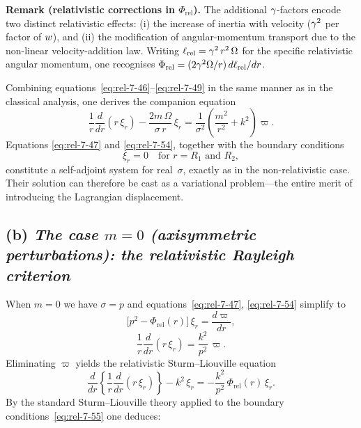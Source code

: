 \medskip
\noindent\textbf{Remark (relativistic corrections in $\Phi_{\mathrm{rel}}$).}
The additional $\gamma$-factors encode two distinct relativistic effects:
(i) the increase of inertia with velocity ($\gamma^{2}$ per factor of
$w$), and (ii) the modification of angular-momentum transport
due to the non-linear velocity-addition law.  Writing
$\ell_{\mathrm{rel}}=\gamma^{2}\,r^{2}\,\Omega$ for the specific
relativistic angular momentum, one recognises
$\Phi_{\mathrm{rel}} = (2\gamma^{2}\Omega/r)\,d\ell_{\mathrm{rel}}/dr$.

Combining equations~\eqref{eq:rel-7-46}--\eqref{eq:rel-7-49} in
the same manner as in the classical analysis, one derives the
companion equation
\begin{equation}
\label{eq:rel-7-54}
\frac{1}{r}\frac{d}{dr}(r\,\xi_r)
- \frac{2m\,\Omega}{\sigma\,r}\,\xi_r
= \frac{1}{\sigma^{2}}
  \!\left(\frac{m^{2}}{r^{2}}+k^{2}\right)\varpi.
\end{equation}
Equations \eqref{eq:rel-7-47} and \eqref{eq:rel-7-54}, together with
the boundary conditions
\begin{equation}
\label{eq:rel-7-55}
\xi_r = 0 \quad\text{for } r = R_1 \text{ and } R_2,
\end{equation}
constitute a self-adjoint system for real~$\sigma$, exactly as in the
non-relativistic case.  Their solution can therefore be cast as a
variational problem---the entire merit of introducing the Lagrangian
displacement.

\subsection*{(b) \emph{The case $m=0$ (axisymmetric perturbations):
  the relativistic Rayleigh criterion}}
\label{sec:rel-7-67b}

When $m=0$ we have $\sigma = p$ and equations~\eqref{eq:rel-7-47},
\eqref{eq:rel-7-54} simplify to
\begin{equation}
\label{eq:rel-7-56}
\bigl[p^{2}-\Phi_{\mathrm{rel}}(r)\bigr]\,\xi_r
= \frac{d\varpi}{dr},
\end{equation}
\begin{equation}
\label{eq:rel-7-57}
\frac{1}{r}\frac{d}{dr}(r\,\xi_r)
= \frac{k^{2}}{p^{2}}\,\varpi.
\end{equation}
Eliminating $\varpi$ yields the relativistic Sturm--Liouville equation
\begin{equation}
\label{eq:rel-7-58}
\frac{d}{dr}\!\left\{
\frac{1}{r}\frac{d}{dr}(r\,\xi_r)\right\}
- k^{2}\,\xi_r
= -\frac{k^{2}}{p^{2}}\,\Phi_{\mathrm{rel}}(r)\,\xi_r.
\end{equation}
By the standard Sturm--Liouville theory applied to the boundary
conditions~\eqref{eq:rel-7-55} one deduces:


